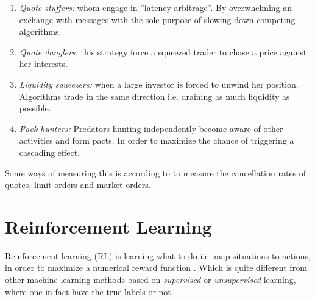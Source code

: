 \documentclass{kththesis}
\theoremstyle{definition}
\begin{document}
\begin{enumerate}
    \item \textit{Quote stuffers:} whom engage in ''latency arbitrage''. By overwhelming an exchange with messages with the sole purpose of slowing down competing algorithms.
    \item \textit{Quote danglers:} this strategy force a squeezed trader to chase a price against her interests. 
    
    \item \textit{Liquidity squeezers:} when a large investor is forced to unwind her position. Algorithms trade in the same direction i.e. draining as much liquidity as possible. 
    \item \textit{Pack hunters:} Predators hunting independently become aware of other activities and form pacts. In order to maximize the chance of triggering a cascading effect.   
\end{enumerate}
Some ways of measuring this is according to \textcite{de2018advances} to measure the cancellation rates of quotes, limit orders and market orders.


\section{Reinforcement Learning}
Reinforcement learning (RL) is learning what to do i.e. map situations to actions, in order to maximize a numerical reward function \parencite{sutton1998reinforcement}. Which is quite different from other machine learning methods based on \textit{supervised} or \textit{unsupervised} learning, where one in fact have the true labels or not.
\end{document}
